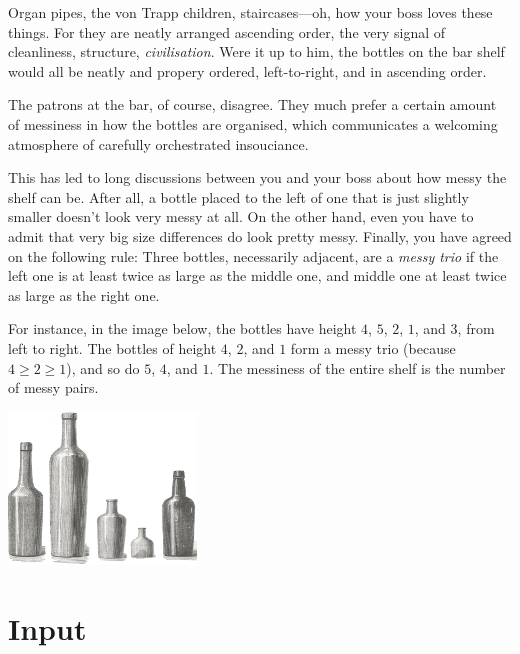 

Organ pipes, the von Trapp children, staircases---oh, how your boss loves these things.
For they are neatly arranged ascending order, the very signal of cleanliness, structure, \emph{civilisation}.
Were it up to him, the bottles on the bar shelf would all be neatly and propery ordered, left-to-right, and in ascending order.

The patrons at the bar, of course, disagree.
They much prefer a certain amount of messiness in how the bottles are organised, which communicates a welcoming atmosphere of carefully orchestrated insouciance. 

This has led to long discussions between you and your boss about how messy the shelf can be.
After all, a bottle placed to the left of one that is just slightly smaller doesn't look very messy at all.
On the other hand, even you have to admit that very big size differences do look pretty messy.
Finally, you have agreed on the following rule:
Three bottles, necessarily adjacent, are a \emph{messy trio} if the left one is at least twice as large as the middle one, and middle one at least twice as large as the right one.

\medskip
For instance, in the image below, the bottles have height $4$, $5$, $2$, $1$, and $3$, from left to right.
The bottles of height $4$, $2$, and $1$ form a messy trio (because $4\geq 2\geq 1$), and so do $5$, $4$, and $1$.
The messiness of the entire shelf is the number of messy pairs.

\medskip
\includegraphics[width = 5cm]{img/messy_bottles.png}



\section*{Input}


